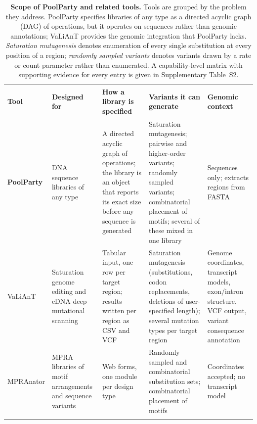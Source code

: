 %

\begin{table}[t]
\centering
\caption{\textbf{Scope of PoolParty and related tools.} Tools are grouped by the
problem they address. PoolParty specifies libraries of any type as a directed
acyclic graph (DAG) of operations, but it operates on sequences rather than genomic
annotations; VaLiAnT provides the genomic integration that PoolParty lacks.
\emph{Saturation mutagenesis} denotes enumeration of every single substitution at
every position of a region; \emph{randomly sampled variants} denotes variants drawn
by a rate or count parameter rather than enumerated. A capability-level matrix with
supporting evidence for every entry is given in Supplementary Table~S2.}
\label{tab:scope}
\footnotesize
\begin{tabular}{@{}p{2.0cm}p{2.45cm}p{3.1cm}p{3.6cm}p{3.05cm}@{}}
\toprule
\textbf{Tool} & \textbf{Designed for} & \textbf{How a library is specified} &
\textbf{Variants it can generate} & \textbf{Genomic context} \\
\midrule

\textbf{PoolParty} &
DNA sequence libraries of any type &
A directed acyclic graph of operations; the library is an object that reports its
exact size before any sequence is generated &
Saturation mutagenesis; pairwise and higher-order variants; randomly sampled
variants; combinatorial placement of motifs; several of these mixed in one library &
Sequences only; extracts regions from FASTA \\
\addlinespace

VaLiAnT &
Saturation genome editing and cDNA deep mutational scanning &
Tabular input, one row per target region; results written per region as CSV and VCF &
Saturation mutagenesis (substitutions, codon replacements, deletions of
user-specified length); several mutation types per target region &
Genome coordinates, transcript models, exon/intron structure, VCF output, variant
consequence annotation \\
\addlinespace

MPRAnator &
MPRA libraries of motif arrangements and sequence variants &
Web forms, one module per design type &
Randomly sampled and combinatorial substitution sets; combinatorial placement of
motifs &
Coordinates accepted; no transcript model \\
\addlinespace


\end{tabular}
\end{table}
